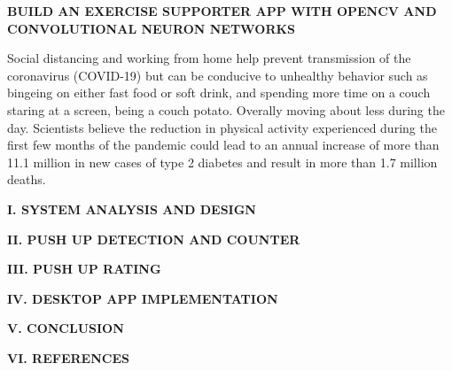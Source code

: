 \documentclass[12pt,a4paper,twoside]{article}
\begin{document}
	\begin{center}
		\begin{large}
			\textbf{BUILD AN EXERCISE SUPPORTER APP WITH OPENCV AND CONVOLUTIONAL NEURON NETWORKS}\\
		\end{large}
	\end{center}

	\begin{flushleft}
		Social distancing and working from home help prevent transmission of the coronavirus (COVID-19) but can be conducive to unhealthy behavior such as bingeing on either fast food or soft drink, and spending more time on a couch staring at a screen, being a couch potato. Overally moving about less during the day. Scientists believe the reduction in physical activity experienced during the first few months of the pandemic could lead to an annual increase of more than 11.1 million in new cases of type 2 diabetes and result in more than 1.7 million deaths.
	\end{flushleft}

	\begin{flushleft}
		\textbf{I. SYSTEM ANALYSIS AND DESIGN}
	\end{flushleft}

	\begin{flushleft}
		\textbf{II. PUSH UP DETECTION AND COUNTER}
	\end{flushleft}

	\begin{flushleft}
		\textbf{III. PUSH UP RATING}
	\end{flushleft}

	\begin{flushleft}
		\textbf{IV. DESKTOP APP IMPLEMENTATION}
	\end{flushleft}

	\begin{flushleft}
		\textbf{V. CONCLUSION}
	\end{flushleft}

	\begin{flushleft}
		\textbf{VI. REFERENCES}
	\end{flushleft}
\end{document}
